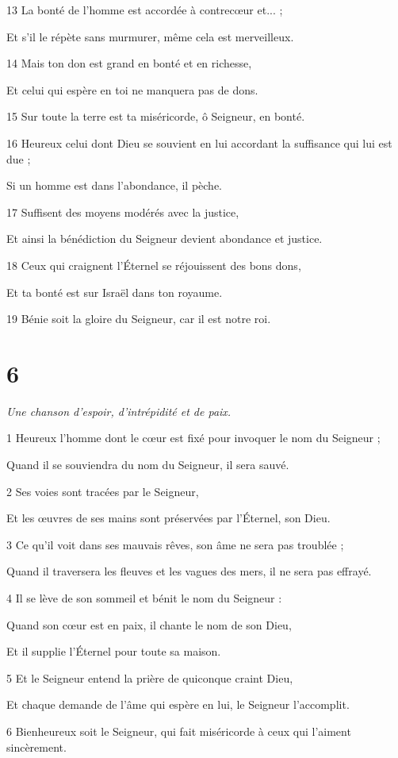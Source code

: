 \par 13 La bonté de l'homme est accordée à contrecœur et... ;
\par     Et s'il le répète sans murmurer, même cela est merveilleux.
\par 14 Mais ton don est grand en bonté et en richesse,
\par     Et celui qui espère en toi ne manquera pas de dons.
\par 15 Sur toute la terre est ta miséricorde, ô Seigneur, en bonté.
\par   
\par 16 Heureux celui dont Dieu se souvient en lui accordant la suffisance qui lui est due ;
\par     Si un homme est dans l’abondance, il pèche.
\par 17 Suffisent des moyens modérés avec la justice,
\par     Et ainsi la bénédiction du Seigneur devient abondance et justice.
\par 18 Ceux qui craignent l'Éternel se réjouissent des bons dons,
\par     Et ta bonté est sur Israël dans ton royaume.
\par   
\par 19 Bénie soit la gloire du Seigneur, car il est notre roi.



\chapter{6}

\par \textit{Une chanson d'espoir, d'intrépidité et de paix.}

\par 1 Heureux l'homme dont le cœur est fixé pour invoquer le nom du Seigneur ;
\par     Quand il se souviendra du nom du Seigneur, il sera sauvé.
\par 2 Ses voies sont tracées par le Seigneur,
\par     Et les œuvres de ses mains sont préservées par l'Éternel, son Dieu.
\par 3 Ce qu'il voit dans ses mauvais rêves, son âme ne sera pas troublée ;
\par     Quand il traversera les fleuves et les vagues des mers, il ne sera pas effrayé.
\par 4 Il se lève de son sommeil et bénit le nom du Seigneur :
\par     Quand son cœur est en paix, il chante le nom de son Dieu,
\par     Et il supplie l'Éternel pour toute sa maison.
\par 5 Et le Seigneur entend la prière de quiconque craint Dieu,
\par     Et chaque demande de l'âme qui espère en lui, le Seigneur l'accomplit.
\par   
\par 6 Bienheureux soit le Seigneur, qui fait miséricorde à ceux qui l'aiment sincèrement.

